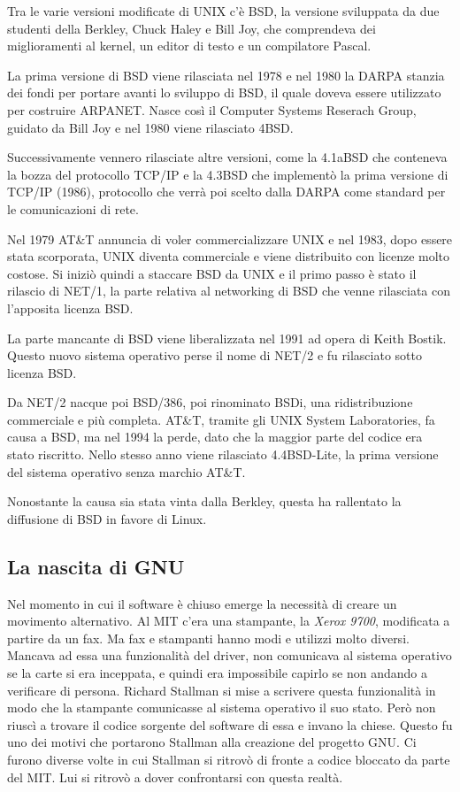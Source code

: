 Tra le varie versioni modificate di UNIX c'è BSD, la versione sviluppata da due studenti della Berkley, Chuck Haley e Bill Joy, che comprendeva dei miglioramenti al kernel, un editor di testo e un compilatore Pascal. 

La prima versione di BSD viene rilasciata nel 1978  e nel 1980 la DARPA stanzia dei fondi per portare avanti lo sviluppo di BSD, il quale doveva essere utilizzato per costruire ARPANET. 
Nasce così il Computer Systems Reserach Group, guidato da Bill Joy e nel 1980 viene rilasciato 4BSD.

Successivamente vennero rilasciate altre versioni, come la 4.1aBSD che conteneva la bozza del protocollo TCP/IP e la 4.3BSD che implementò la prima versione di TCP/IP (1986), protocollo che verrà poi scelto dalla DARPA come standard per le comunicazioni di rete. 

Nel 1979 AT\&T annuncia di voler commercializzare UNIX e nel 1983, dopo essere stata scorporata, UNIX diventa commerciale e viene distribuito con licenze molto costose. Si iniziò quindi a staccare BSD da UNIX e il primo passo è stato il rilascio di NET/1, la parte relativa al networking di BSD che venne rilasciata con l'apposita licenza BSD.

La parte mancante di BSD viene liberalizzata nel 1991 ad opera di Keith Bostik. Questo nuovo sistema operativo perse il nome di NET/2 e fu rilasciato sotto licenza BSD.

Da NET/2 nacque poi BSD/386, poi rinominato BSDi, una ridistribuzione commerciale e più completa.
AT\&T, tramite gli UNIX System Laboratories, fa causa a BSD, ma nel 1994 la perde, dato che la maggior parte del codice era stato riscritto. Nello stesso anno viene rilasciato 4.4BSD-Lite, la prima versione del sistema operativo senza marchio AT\&T.

Nonostante la causa sia stata vinta dalla Berkley, questa ha rallentato la diffusione di BSD in favore di Linux.

\subsection{La nascita di GNU}

Nel momento in cui il software è chiuso emerge la necessità di creare un movimento alternativo. Al MIT c'era una stampante, la \textit{Xerox 9700}, modificata a partire da un fax. Ma fax e stampanti hanno modi e utilizzi molto diversi. Mancava ad essa una funzionalità del driver, non comunicava al sistema operativo se la carte si era inceppata, e quindi era impossibile capirlo se non andando a verificare di persona. Richard Stallman si mise a scrivere questa funzionalità in modo che la stampante comunicasse al sistema operativo il suo stato. Però non riuscì a trovare il codice sorgente del software di essa e invano la chiese. Questo fu uno dei motivi che portarono Stallman alla creazione del progetto GNU. Ci furono diverse volte in cui Stallman si ritrovò di fronte a codice bloccato da parte del MIT. Lui si ritrovò a dover confrontarsi con questa realtà.

